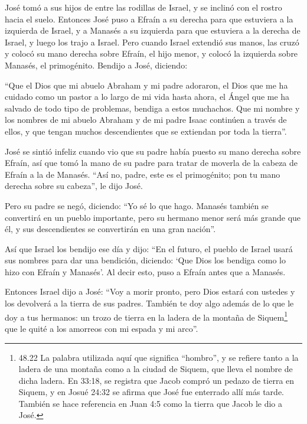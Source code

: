  José tomó a sus hijos de entre las rodillas de Israel, y
se inclinó con el rostro hacia el suelo.  Entonces José
puso a Efraín a su derecha para que estuviera a la izquierda de Israel,
y a Manasés a su izquierda para que estuviera a la derecha de Israel, y
luego los trajo a Israel.  Pero cuando Israel extendió sus
manos, las cruzó y colocó su mano derecha sobre Efraín, el hijo menor, y
colocó la izquierda sobre Manasés, el primogénito.  Bendijo
a José, diciendo:

``Que el Dios que mi abuelo Abraham y mi padre adoraron, el Dios que me
ha cuidado como un pastor a lo largo de mi vida hasta ahora,
 el Ángel que me ha salvado de todo tipo de problemas,
bendiga a estos muchachos. Que mi nombre y los nombres de mi abuelo
Abraham y de mi padre Isaac continúen a través de ellos, y que tengan
muchos descendientes que se extiendan por toda la tierra''.

 José se sintió infeliz cuando vio que su padre había
puesto su mano derecha sobre Efraín, así que tomó la mano de su padre
para tratar de moverla de la cabeza de Efraín a la de Manasés.
 ``Así no, padre, este es el primogénito; pon tu mano
derecha sobre su cabeza'', le dijo José.

 Pero su padre se negó, diciendo: ``Yo sé lo que hago.
Manasés también se convertirá en un pueblo importante, pero su hermano
menor será más grande que él, y sus descendientes se convertirán en una
gran nación''.

 Así que Israel los bendijo ese día y dijo: ``En el futuro,
el pueblo de Israel usará sus nombres para dar una bendición, diciendo:
`Que Dios los bendiga como lo hizo con Efraín y Manasés'. Al decir esto,
puso a Efraín antes que a Manasés.

 Entonces Israel dijo a José: ``Voy a morir pronto, pero
Dios estará con ustedes y los devolverá a la tierra de sus padres.
 También te doy algo además de lo que le doy a tus
hermanos: un trozo de tierra en la ladera de la montaña de
Siquem\footnote{48.22 La palabra utilizada aquí que significa
  ``hombro'', y se refiere tanto a la ladera de una montaña como a la
  ciudad de Siquem, que lleva el nombre de dicha ladera. En 33:18, se
  registra que Jacob compró un pedazo de tierra en Siquem, y en Josué
  24:32 se afirma que José fue enterrado allí más tarde. También se hace
  referencia en Juan 4:5 como la tierra que Jacob le dio a José.} que le
quité a los amorreos con mi espada y mi arco''.

